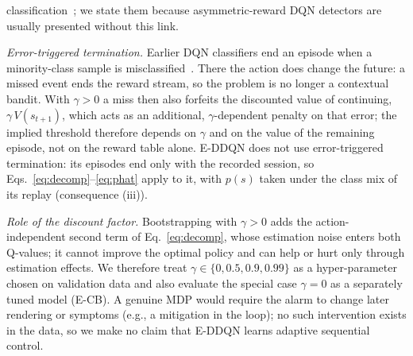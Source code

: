 classification~\cite{dudik2011efficient}; we state them because asymmetric-reward DQN detectors are usually presented without this link.

\emph{Error-triggered termination.} Earlier DQN classifiers end an episode when a minority-class sample is misclassified~\cite{lin2020imbalanced,yang2024drlimbalanced}. There the action does change the future: a missed event ends the reward stream, so the problem is no longer a contextual bandit. With $\gamma>0$ a miss then also forfeits the discounted value of continuing, $\gamma\,V(s_{t+1})$, which acts as an additional, $\gamma$-dependent penalty on that error; the implied threshold therefore depends on $\gamma$ and on the value of the remaining episode, not on the reward table alone. E-DDQN does not use error-triggered termination: its episodes end only with the recorded session, so Eqs.~\eqref{eq:decomp}--\eqref{eq:phat} apply to it, with $p(s)$ taken under the class mix of its replay (consequence (iii)).

\emph{Role of the discount factor.} Bootstrapping with $\gamma>0$ adds the action-independent second term of Eq.~\eqref{eq:decomp}, whose estimation noise enters both Q-values; it cannot improve the optimal policy and can help or hurt only through estimation effects. We therefore treat $\gamma\in\{0,0.5,0.9,0.99\}$ as a hyper-parameter chosen on validation data and also evaluate the special case $\gamma=0$ as a separately tuned model (E-CB). A genuine MDP would require the alarm to change later rendering or symptoms (e.g., a mitigation in the loop); no such intervention exists in the data, so we make no claim that E-DDQN learns adaptive sequential control.

